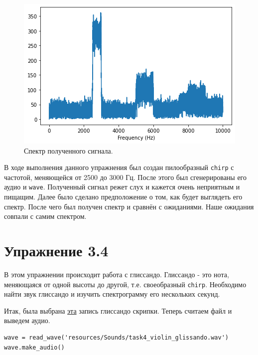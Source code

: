 \documentclass[a4paper, 14pt]{extarticle}
\begin{document}
    \begin{figure}[H]
        \centering
        \includegraphics[width=0.8\linewidth]{resources/Images/task3_spectrum}
        \caption{Спектр полученного сигнала.}
        \label{fig:task3_spectrum}
    \end{figure}

    В ходе выполнения данного упражнения был создан пилообразный \texttt{chirp} с частотой, меняющейся от 2500 до 3000 Гц.
    После этого был сгенерированы его аудио и \texttt{wave}. Полученный сигнал режет слух и кажется очень неприятным и пищащим.
    Далее было сделано предположение о том, как будет выглядеть его спектр. После чего был получен спектр и сравнён с ожиданиями.
    Наше ожидания совпали с самим спектром.

    \newpage

    \section{Упражнение 3.4}
    \label{sec:task4}

    В этом упражнении происходит работа с глиссандо.
    Глиссандо - это нота, меняющаяся от одной высоты до другой, т.е. своеобразный \texttt{chirp}.
    Необходимо найти звук глиссандо и изучить спектрограмму его нескольких секунд.

    Итак, была выбрана \href{https://freesound.org/people/InspectorJ/sounds/411728/}{эта} запись глиссандо скрипки.
    Теперь считаем файл и выведем аудио.

    \begin{lstlisting}[caption= Считывание и воспроизведение файла., label={lst:task4_wave}]
wave = read_wave('resources/Sounds/task4_violin_glissando.wav')
wave.make_audio()
    \end{lstlisting}
\end{document}
